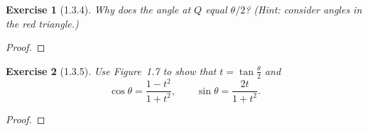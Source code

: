 \documentclass[12pt]{article}
\theoremstyle{plain}
\newtheorem{ex}{Exercise}
\begin{document}
\begin{ex} [1.3.4]
  Why does the angle at $Q$ equal $\theta/2$? (Hint: consider angles in the red triangle.)
\end{ex}

\begin{proof}
 
\end{proof}

\begin{ex} [1.3.5]
  Use Figure~1.7 to show that $t=\tan\frac{\theta}{2}$ and
  \[
    \cos\theta=\frac{1-t^2}{1+t^2},\qquad\sin\theta=\frac{2t}{1+t^2}.
  \]
\end{ex}

\begin{proof}
 
\end{proof}
\end{document}
